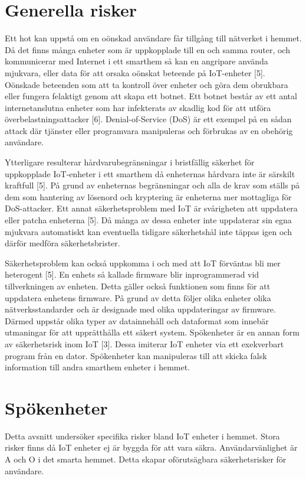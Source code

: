 \documentclass[conference]{IEEEtran}
\begin{document}
\section{Generella risker}
Ett hot kan uppstå om en oönskad användare får tillgång till nätverket i hemmet. Då det finns många enheter som är uppkopplade till en och samma router, och kommunicerar med Internet i ett smarthem så kan en angripare använda mjukvara, eller data för att orsaka oönskat beteende på IoT-enheter [5]. Oönskade beteenden som att ta kontroll över enheter och göra dem obrukbara eller fungera felaktigt genom att skapa ett botnet. Ett botnet består av ett antal internetanslutna enheter som har infekterats av skadlig kod för att utföra överbelastningsattacker [6]. Denial-of-Service (DoS) är ett exempel på en sådan attack där tjänster eller programvara manipuleras och förbrukas av en obehörig användare.

Ytterligare resulterar hårdvarubegränsningar i bristfällig säkerhet för uppkopplade IoT-enheter i ett smarthem då enheternas hårdvara inte är särskilt kraftfull [5]. På grund av enheternas begränsningar och alla de krav som ställs på dem som hantering av lösenord och kryptering är enheterna mer mottagliga för DoS-attacker. Ett annat säkerhetsproblem med IoT är svårigheten att uppdatera eller patcha enheterna [5]. Då många av dessa enheter inte uppdaterar sin egna mjukvara automatiskt kan eventuella tidigare säkerhetshål inte täppas igen och därför medföra säkerhetsbrister.

 Säkerhetsproblem kan också uppkomma i och med att IoT förväntas bli mer heterogent [5]. En enhets så kallade firmware blir inprogrammerad vid tillverkningen av enheten. Detta gäller också funktionen som finns för att uppdatera enhetens firmware. På grund av detta följer olika enheter olika nätverksstandarder och är designade med olika uppdateringar av firmware. Därmed uppstår olika typer av datainnehåll och dataformat som innebär utmaningar för att upprätthålla ett säkert system. Spökenheter är en annan form av säkerhetsrisk inom IoT [3]. Dessa imiterar IoT enheter via ett exekverbart program från en dator. Spökenheter kan manipuleras till att skicka falsk information till andra smarthem enheter i hemmet. 


\section{Spökenheter}
Detta avsnitt undersöker specifika risker bland IoT enheter i hemmet. Stora risker finns då IoT enheter ej är byggda för att vara säkra. Användarvänlighet är A och O i det smarta hemmet. Detta skapar oförutsägbara säkerhetsrisker för användare. 
\end{document}
